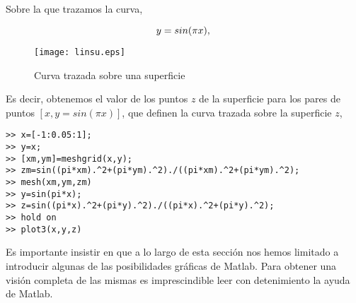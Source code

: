 Sobre la que trazamos la curva,

\begin{equation*}
y=sin(\pi x),\\
\end{equation*}

\begin{figure}[h]
\centering
\texttt{[image: linsu.eps]}
\caption{Curva trazada sobre una superficie}
\label{fig:cvsurf}
\end{figure}

Es decir, obtenemos el valor de los puntos $z$ de la superficie para los pares de puntos $[x, y = sin(\pi x)]$, que definen la curva trazada sobre la superficie $z$,

\begin{verbatim}
>> x=[-1:0.05:1];
>> y=x;
>> [xm,ym]=meshgrid(x,y);
>> zm=sin((pi*xm).^2+(pi*ym).^2)./((pi*xm).^2+(pi*ym).^2);
>> mesh(xm,ym,zm)
>> y=sin(pi*x);
>> z=sin((pi*x).^2+(pi*y).^2)./((pi*x).^2+(pi*y).^2);
>> hold on
>> plot3(x,y,z)
\end{verbatim}

Es importante insistir en que a lo largo de esta sección nos hemos limitado a introducir algunas de las posibilidades gráficas de Matlab. Para obtener una visión completa de las mismas es imprescindible leer con detenimiento la ayuda de Matlab.
